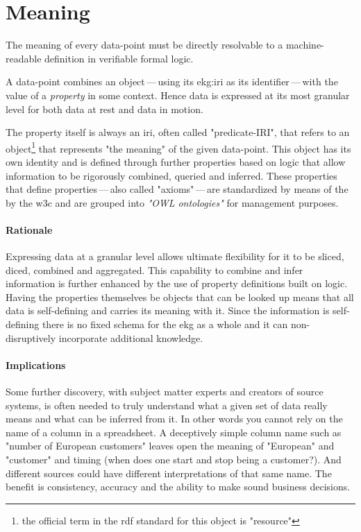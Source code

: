 \section{Meaning}\label{sec:ekg-principle-meaning}

The meaning of every \gls{data-point} must be directly resolvable
to a machine-readable definition in verifiable formal logic.

A \gls{data-point} combines an object\,---\,using its \gls{ekg:iri} as its identifier\,---\,with the value
of a \textit{property} in some context.
Hence data is expressed at its most granular level for both data at rest and data in motion.

The property itself is always an \gls{iri}, often called "predicate-IRI", that refers to an object\footnote{%
    the official term in the \gls{rdf} standard for this object is "resource"%
} that represents "the meaning" of the given \gls{data-point}.
This object has its own identity and is defined through further properties
based on logic that allow information to be rigorously combined, queried and inferred.
These properties that define properties\,---\,also called "axioms"\,---\,are standardized by means of the 
by the \gls{w3c} and are grouped into \textit{"OWL ontologies"} for management purposes.


\paragraph{Rationale} Expressing data at a granular level allows ultimate flexibility
for it to be sliced, diced, combined and aggregated.
This capability to combine and infer information is further enhanced by the use of \gls{property} definitions
built on logic.
Having the properties themselves be objects that can be looked up means that all data
is self-defining and carries its meaning with it.
Since the information is self-defining there is no fixed schema for the \gls{ekg}
as a whole and it can non-disruptively incorporate additional knowledge.

\paragraph{Implications} Some further discovery, with subject matter experts and
creators of source systems, is often needed to truly understand what a given
set of data really means and what can be inferred from it.
In other words you cannot rely on the name of a column in a spreadsheet.
A deceptively simple column name such as "number of European customers" leaves
open the meaning of "European" and "customer" and timing (when does one start
and stop being a customer?).
And different sources could have different interpretations of that same name.
The benefit is consistency, accuracy and the ability to make sound business decisions.

